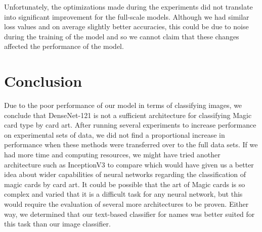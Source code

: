 \documentclass[letterpaper]{article} %
\begin{document}
Unfortunately, the optimizations made during the experiments did not translate
into significant improvement for the full-scale models. Although we had similar
loss values and on average slightly better accuracies, this could be due to
noise during the training of the model and so we cannot claim that these changes
affected the performance of the model.

\section{Conclusion}

Due to the poor performance of our model in terms of classifying images, we
conclude that DenseNet-121 is not a sufficient architecture for classifying
Magic card type by card art. After running several experiments to increase
performance on experimental sets of data, we did not find a proportional
increase in performance when these methods were transferred over to the full
data sets. If we had more time and computing resources, we might have tried
another architecture such as InceptionV3 to compare which would have given us
a better idea about wider capabilities of neural networks regarding the
classification of magic cards by card art. It could be possible that the art of
Magic cards is so complex and varied that it is a difficult task for any neural
network, but this would require the evaluation of several more architectures to
be proven. Either way, we determined that our text-based classifier for names
was better suited for this task than our image classifier.




\end{document}

